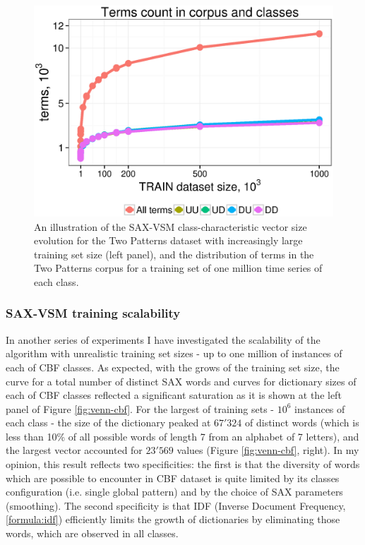 \begin{figure}[t]
   \includegraphics[width=140mm]{figures/words-two-patterns.ps}
   \caption{An illustration of the SAX-VSM class-characteristic vector size evolution for the Two Patterns dataset 
   with increasingly large training set size (left panel), and the distribution of terms in the Two Patterns corpus for 
   a training set of one million time series of each class.}
   \label{fig:venn-2p}
\end{figure}

\subsubsection{SAX-VSM training scalability }
In another series of experiments I have investigated the scalability of the algorithm with
unrealistic training set sizes - up to one million of instances of each of CBF classes.
As expected, with the grows of the training set size, the curve for a total number of distinct SAX
words and curves for dictionary sizes of each of CBF classes reflected a significant saturation 
as it is shown at the left panel of Figure \ref{fig:venn-cbf}. 
For the largest of training sets - $10^6$ instances of each class - the size of the dictionary peaked at $67'324$ 
of distinct words (which is less than 10\% of all possible words of length 7 from an alphabet of 7 letters), 
and the largest \tfidf vector accounted for $23'569$ values (Figure \ref{fig:venn-cbf}, right). 
In my opinion, this result reflects two specificities: the first is that the diversity of words which 
are possible to encounter in CBF dataset is quite limited by its classes configuration (i.e. single global 
pattern) and by the choice of SAX parameters (smoothing). 
The second specificity is that IDF (Inverse Document Frequency, \ref{formula:idf})
efficiently limits the growth of dictionaries by eliminating those words, which are observed in all
classes. 

